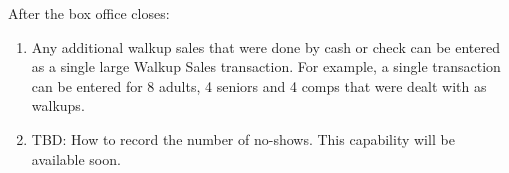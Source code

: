 After the box office closes:

\begin{enumerate}
\item Any additional walkup sales that were done by cash or check can be
  entered as a single large Walkup Sales transaction.  For example, a
  single transaction can be entered for 8 adults, 4 seniors and 4 comps
  that were dealt with as walkups.
\item TBD:  How to record the number of no-shows.  This capability will
  be available soon.
\end{enumerate}

